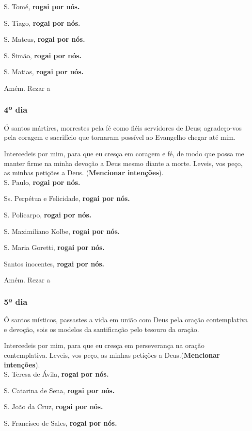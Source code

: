 \documentclass[a4paper,14pt]{extarticle} \usepackage[utf8]{inputenc}
\begin{document}
S. Tomé, \textbf{rogai por nós.}

S. Tiago, \textbf{rogai por nós.}

S. Mateus, \textbf{rogai por nós.}

S. Simão, \textbf{rogai por nós.}

S. Matias, \textbf{rogai por nós.}

Amém. Rezar a 
\subsubsection{4º dia}

Ó santos mártires, morrestes pela fé como fiéis servidores de Deus; agradeço-vos pela coragem e sacrifício que tornaram possível ao Evangelho chegar até mim.

Intercedeis por mim, para que eu cresça em coragem e fé, de modo que possa me manter firme na minha devoção a Deus mesmo diante a morte. Leveis, vos peço, as minhas petições a Deus. (\textbf{Mencionar intenções}).\\

S. Paulo, \textbf{rogai por nós.}

Ss. Perpétua e Felicidade, \textbf{rogai por nós.}

S. Policarpo, \textbf{rogai por nós.}

S. Maximiliano Kolbe, \textbf{rogai por nós.}

S. Maria Goretti, \textbf{rogai por nós.}

Santos inocentes, \textbf{rogai por nós.}

Amém. Rezar a 
\subsubsection{5º dia}

Ó santos místicos, passastes a vida em união com Deus pela oração contemplativa e devoção, sois os modelos da santificação pelo tesouro da oração.

Intercedeis por mim, para que eu cresça em perseverança na oração contemplativa. Leveis, vos peço, as minhas petições a Deus.(\textbf{Mencionar intenções}).\\

S. Teresa de Ávila, \textbf{rogai por nós.}

S. Catarina de Sena, \textbf{rogai por nós.}

S. João da Cruz, \textbf{rogai por nós.}

S. Francisco de Sales, \textbf{rogai por nós.}
\end{document}
